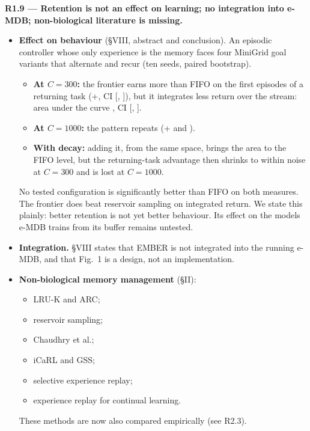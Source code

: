 \documentclass[11pt]{article}
\newcommand{\comment}[1]{\par\medskip\noindent\textbf{#1}\par}
\begin{document}
\comment{R1.9 --- Retention is not an effect on learning; no integration into e-MDB; non-biological literature is missing.}
\begin{itemize}
\item \textbf{Effect on behaviour} (§VIII, abstract and conclusion). An
episodic controller whose only experience is the memory faces four MiniGrid
goal variants that alternate and recur (ten seeds, paired bootstrap).
\begin{itemize}
\item \textbf{At $C=300$:} the frontier earns more than FIFO on the first
episodes of a returning task
(+,
CI
[,
]),
but it integrates less return over the stream: area under the curve
,
CI
[,
].
\item \textbf{At $C=1000$:} the pattern repeats
(+
and
).
\item \textbf{With decay:} adding it, from the same space, brings the area to
the FIFO level, but the returning-task advantage then shrinks to within noise
at $C=300$ and is lost at $C=1000$.
\end{itemize}
No tested configuration is significantly better than FIFO on both measures.
The frontier does beat reservoir sampling on integrated return. We state this
plainly: better retention is not yet better behaviour. Its effect on the
models e-MDB trains from its buffer remains untested.
\item \textbf{Integration.} §VIII states that EMBER is not integrated into
the running e-MDB, and that Fig.~1 is a design, not an implementation.
\item \textbf{Non-biological memory management} (§II):
\begin{itemize}
\item LRU-K and ARC;
\item reservoir sampling;
\item Chaudhry et al.;
\item iCaRL and GSS;
\item selective experience replay;
\item experience replay for continual learning.
\end{itemize}
These methods are now also compared empirically (see R2.3).
\end{itemize}
\end{document}
